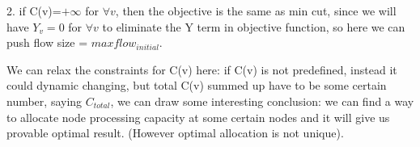 \documentclass{sig-alternate}
\begin{document}
2. if C(v)=$+\infty$  for $\forall v$, then the objective is the same as min cut, since we will have $Y_v=0$ for $\forall v$ to eliminate the Y term in objective function, so here we can push flow size = $maxflow_{initial}$.

We can relax the constraints for C(v) here: if C(v) is not predefined, instead it could dynamic changing, but total C(v) summed up have to be some certain number, saying $C_{total}$, we can draw some interesting conclusion: we can find a way to allocate node processing capacity at some certain nodes and it will give us provable optimal result. (However optimal allocation is not unique).
\begin{comment}
\begin{algorithm}\label {C(v) Allocation}
\SetAlgoLined
 \KwData{\textit{V, E, $C_{total}$}}
 \KwResult{C(v) for $\forall v$}
\BlankLine
Find the min cut for G(V, E)\;
\emph{ define border node: $\forall v \in set_s$ , where there are edges (v, w) where w $\in set_t$ with B((v, w))>0 }\; 
For all border nodes v from one side of the min cut\;
C(v) = $\frac{ \sum\limits_{<v, w>; w\not\in set_s } B(<v,w>) } {MinCut} * C_{total}$
\caption{C(v) Allocation}
\end{algorithm}
\end{comment}


\begin{comment}
Now let us focus on the case of only one node with C(v)>0. For all paths $\pi$ not going through v, they would simply have no flow since the paths cannot process the flow workload. This would be reflected in  $Y_{v'}\geq 1;\forall v'\in \{V-v\}$, and for all paths where they do go through v, we can reduce that to a Min-Cut problem. The max flow we can send from source to destination is essentially bottlenecked by three constraints: link capacity among links from source to node v, processing capacity at node v and link capacity among links from node v to destination. Here to simplify the math representation in following section, we define function mincut(u) as the max flow from source to destination via paths through node u, so we have min(v)=$min\{mincut(u), C(v)\}$.

Now let us extend this into two nodes $v_1, v_2$ where C($v_1, v_2$)>0,
for all paths $\pi$ not going through either $v_1$ or $ v_2$, they would simply have no flow since the paths cannot process the flow workload. However the max flow for a graph with two nodes would be more complex. As $v_1;v_2$ processing capacity is cumulative, naturally if $v_1$ and $v_2$ are at disjoint paths except source and dest, they are just two separate cases we mentioned above. However we need to consider the correlation between $v_1$ and $v_2$. The combined flow sent through both $v_1$ and $v_2$ cannot exceed the bandwidth total = mincut($v_1,v_2$). So we have min($v_1, v_2$) = $min \{mincut(v_1, v_2), [min(v_1)+min(v_2)]\}$.

Now let us extend the case to three nodes and more:\newline
For three nodes:\newline
min($v_1, v_2, v_3$) = $min \{mincut(v_1, v_2, v_3), min\{[min(v_1, v_2)+min(v_3)],[min(v_1, v_3)+min(v_2)], [min(v_3, v_2)+min(v_1)]\} \}$.
\end{comment}
\end{document}
